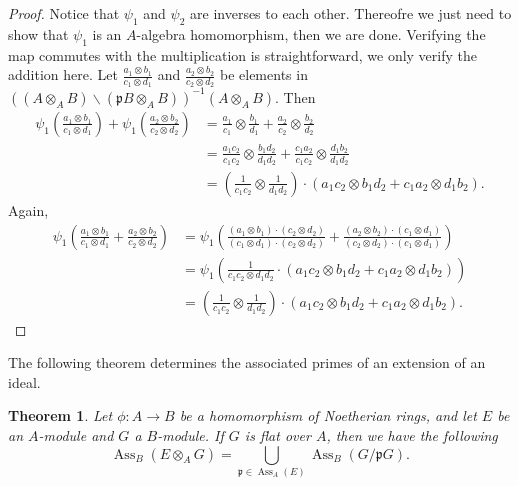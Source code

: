 \documentclass[12pt]{amsart}
\numberwithin{equation}{section}
\newtheorem{theorem}{Theorem}[section]
\theoremstyle{definition}
\DeclareMathOperator{\Ass}{Ass}
\begin{document}
\begin{proof}
Notice that $\psi_1$ and $\psi_2$ are inverses to each other. Thereofre we just need to show that $\psi_1$ is an $A$-algebra homomorphism, then we are done. Verifying the map commutes with the multiplication is straightforward, we only verify the addition here. 
   Let $\frac{a_1 \otimes b_1}{c_1 \otimes d_1}$ and $\frac{a_2 \otimes b_2}{c_2 \otimes d_2}$ be elements in $( (A \otimes_A B) \backslash (\mathfrak{p}B \otimes_A B) )^{-1} (A \otimes_A B)$. Then
	\begin{align*}
	\psi_1 \left(\frac{a_1 \otimes b_1}{c_1 \otimes d_1}\right) +  \psi_1 \left(\frac{a_2 \otimes b_2}{c_2 \otimes d_2}\right)&=\frac{a_1}{c_1} \otimes \frac{b_1}{d_1} + \frac{a_2}{c_2} \otimes \frac{b_2}{d_2}\\
	&= \frac{a_1 c_2}{c_1 c_2} \otimes \frac{b_1 d_2}{d_1 d_2} + \frac{c_1 a_2}{c_1 c_2} \otimes \frac{d_1 b_2}{d_1 d_2} \\
	&=\left(\frac{1}{c_1 c_2} \otimes \frac{1}{d_1 d_2}\right) \cdot ( a_1 c_2 \otimes b_1 d_2 + c_1 a_2 \otimes d_1 b_2 ).
	\end{align*}
Again, 	
\begin{align*}
\psi_1 \left( \frac{a_1 \otimes b_1}{c_1 \otimes d_1} + \frac{a_2 \otimes b_2}{c_2 \otimes d_2} \right) &= \psi_1 \left( \frac{ (a_1 \otimes b_1) \cdot (c_2 \otimes d_2)}{ (c_1 \otimes d_1) \cdot (c_2 \otimes d_2) } + \frac{ (a_2 \otimes b_2) \cdot (c_1 \otimes d_1)}{ (c_2 \otimes d_2) \cdot (c_1 \otimes d_1) } \right)\\
& = \psi_1 \left( \frac{1}{c_1 c_2 \otimes d_1 d_2} \cdot (a_1 c_2 \otimes b_1 d_2 + c_1 a_2 \otimes d_1 b_2) \right) \\
&= \left(\frac{1}{c_1 c_2} \otimes \frac{1}{d_1 d_2}\right) \cdot \left( a_1 c_2 \otimes b_1 d_2 + c_1 a_2 \otimes d_1 b_2 \right).
\end{align*}
	\end{proof}
    
The following theorem determines the associated primes of  an extension of an ideal.   
	
	
	\begin{theorem}\label{theorem: associated primes under extension from Matsumura}
		\cite[Theorem 23.2]{matsumura1989commutative} Let $\phi: A\to B$ be a homomorphism of Noetherian rings, and let $E$ be an $A$-module and $G$ a $B$-module. If $G$ is flat over $A$, then we have the following
		$$	\Ass_B (E \otimes_A G) = \bigcup_{\mathfrak{p} \in \Ass_A(E)} \Ass_B (G/\mathfrak{p}G).$$
	\end{theorem}
\end{document}
